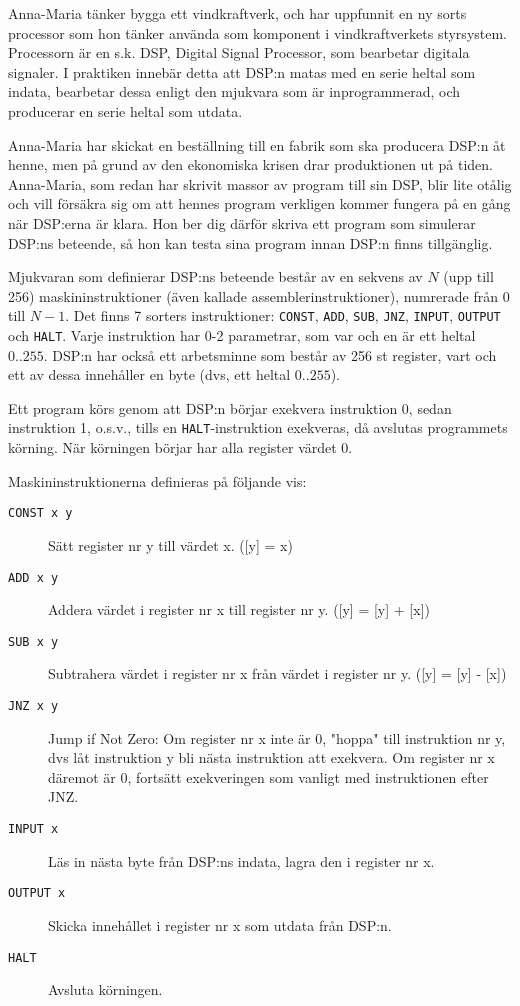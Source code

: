 
Anna-Maria tänker bygga ett vindkraftverk, och har uppfunnit en ny sorts processor som hon tänker använda som komponent i vindkraftverkets styrsystem. Processorn är en s.k. DSP, Digital Signal Processor, som bearbetar digitala signaler. I praktiken innebär detta att DSP:n matas med en serie heltal som indata, bearbetar dessa enligt den mjukvara som är inprogrammerad, och producerar en serie heltal som utdata.

Anna-Maria har skickat en beställning till en fabrik som ska producera DSP:n åt henne, men på grund av den ekonomiska krisen drar produktionen ut på tiden. Anna-Maria, som redan har skrivit massor av program till sin DSP, blir lite otålig och vill försäkra sig om att hennes program verkligen kommer fungera på en gång när DSP:erna är klara. Hon ber dig därför skriva ett program som simulerar DSP:ns beteende, så hon kan testa sina program innan DSP:n finns tillgänglig.

Mjukvaran som definierar DSP:ns beteende består av en sekvens av $N$ (upp till 256) maskininstruktioner (även kallade assemblerinstruktioner), numrerade från $0$ till $N-1$. Det finns 7 sorters instruktioner: \texttt{CONST}, \texttt{ADD}, \texttt{SUB}, \texttt{JNZ}, \texttt{INPUT}, \texttt{OUTPUT} och \texttt{HALT}. Varje instruktion har 0-2 parametrar, som var och en är ett heltal $0..255$. DSP:n har också ett arbetsminne som består av 256 st register, vart och ett av dessa innehåller en byte (dvs, ett heltal $0..255$).

Ett program körs genom att DSP:n börjar exekvera instruktion 0, sedan instruktion 1, o.s.v., tills en \texttt{HALT}-instruktion exekveras, då avslutas programmets körning. När körningen börjar har alla register värdet 0. 

Maskininstruktionerna definieras på följande vis: 

\begin{description}
\item[\texttt{CONST x y}] Sätt register nr y till värdet x. ([y] = x)
\item[\texttt{ADD x y}] Addera värdet i register nr x till register nr y. ([y] = [y] + [x])
\item[\texttt{SUB x y}] Subtrahera värdet i register nr x från värdet i register nr y. ([y] = [y] - [x])
\item[\texttt{JNZ x y}] Jump if Not Zero: Om register nr x inte är 0, "hoppa" till instruktion nr y, dvs låt instruktion y bli nästa instruktion att exekvera. Om register nr x däremot är 0, fortsätt exekveringen som vanligt med instruktionen efter JNZ.
\item[\texttt{INPUT x}] Läs in nästa byte från DSP:ns indata, lagra den i register nr x.
\item[\texttt{OUTPUT x}] Skicka innehållet i register nr x som utdata från DSP:n.
\item[\texttt{HALT}] Avsluta körningen.
\end{description}


